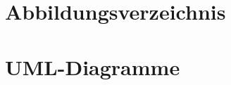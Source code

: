 \clearpage

\renewcommand{\listfigurename}{}
\section{Abbildungsverzeichnis}
\listoffigures


\section{UML-Diagramme}
